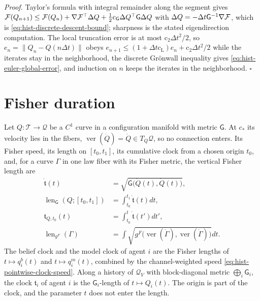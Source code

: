 \noindent\emph{Proof.}
Taylor's formula with integral remainder along the segment gives
$\mathcal F(Q_{n+1})\leq\mathcal F(Q_n)+\nabla\mathcal F^\top\Delta Q+\tfrac12\mathrm
c_{\mathsf G}\Delta Q^\top\mathsf G\Delta Q$ with
$\Delta Q=-\Delta t\mathsf G^{-1}\nabla\mathcal F$, which is
\eqref{eq:hist-discrete-descent-bound}; sharpness is the stated eigendirection
computation.  The local truncation error is at most $\mathrm c_2\Delta t^2/2$, so
$e_n=\lVert Q_n-Q(n\Delta t)\rVert$ obeys
$e_{n+1}\leq(1+\Delta t\mathrm c_{\mathrm L})e_n+\mathrm c_2\Delta t^2/2$ while the iterates
stay in the neighborhood, the discrete Gr\"onwall inequality gives
\eqref{eq:hist-euler-global-error}, and induction on $n$ keeps the iterates in the
neighborhood.  $\square$

\section{Fisher duration}
\label{sec:hist-fisher-duration}
\label{sec:pb-curve-taxonomy}
\label{sec:hist-clock-tiers}

Let $Q:\mathcal T\to\mathcal Q$ be a $C^1$ curve in a configuration manifold with metric
$\mathsf G$.  At $c_*$ its velocity lies in the fibers, $\operatorname{ver}(\dot Q)=\dot
Q\in T_Q\mathcal Q$, so no connection enters.  Its Fisher speed, its length on
$[t_0,t_1]$, its cumulative clock from a chosen origin $t_0$, and, for a curve $\Gamma$
in one law fiber with its Fisher metric, the vertical Fisher length are
\begin{align}
\dot{\mathfrak t}(t)
&=\sqrt{\mathsf G\bigl(\dot Q(t),\dot Q(t)\bigr)},
\label{eq:hist-fisher-speed}\\
\operatorname{len}_{\mathsf G}(Q;[t_0,t_1])
&=\int_{t_0}^{t_1}\dot{\mathfrak t}(t) dt,
\label{eq:hist-fisher-length}\\
\mathfrak t_{Q,t_0}(t)
&=\int_{t_0}^{t}\dot{\mathfrak t}(t') dt',
\label{eq:hist-cumulative-fisher-clock}\\
\operatorname{len}_{g^F}(\Gamma)
&=\int\sqrt{g^F\bigl(\operatorname{ver}(\dot\Gamma),\operatorname{ver}(\dot\Gamma)\bigr)} dt .
\label{eq:pb-vertical-fisher-length}
\end{align}
The belief clock and the model clock of agent $i$ are the Fisher lengths of
$t\mapsto q_i^b(t)$ and $t\mapsto q_i^m(t)$, combined by the channel-weighted speed
\eqref{eq:hist-pointwise-clock-speed}.  Along a history of $\mathcal Q_V$ with
block-diagonal metric $\bigoplus_i\mathsf G_i$, the clock $\mathfrak t_i$ of agent $i$ is
the $\mathsf G_i$-length of $t\mapsto Q_i(t)$.  The origin is part of the clock, and the
parameter $t$ does not enter the length.

